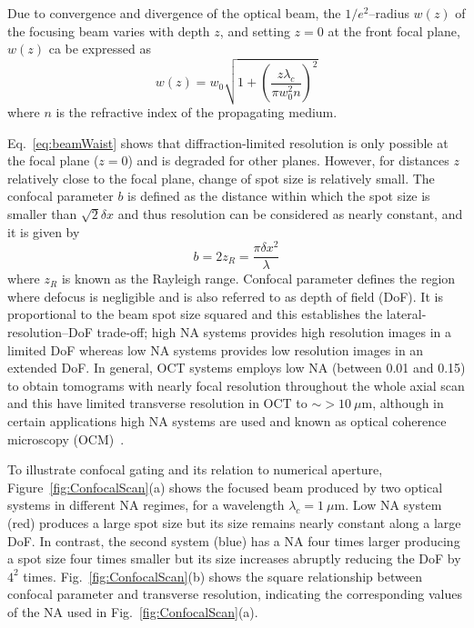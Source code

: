 Due to convergence and divergence of the optical beam, the $1/e^2$--radius $w(z)$  of the focusing beam varies with depth $z$, and setting $z=0$ at the front focal plane, $w(z)$ ca be expressed as~\cite{Ralston2005_Deconvolution}
\begin{equation}\label{eq:beamWaist}
    w(z) = w_0 \sqrt{1 + \left(\frac{z\lambda_c}{\pi w_0^2n}\right)^2}
\end{equation}
where $n$ is the refractive index of the propagating medium.

Eq.~\ref{eq:beamWaist} shows that diffraction-limited resolution is only possible at the focal plane ($z=0$) and is degraded for other planes. However, for distances $z$ relatively close to the focal plane, change of spot size is relatively small. The confocal parameter $b$ is defined as the distance within which the spot size is smaller than $\sqrt{2}\delta x$ and thus resolution can be considered as nearly constant, and it is given by~\cite{Ralston2005_Deconvolution}
\begin{equation}
    b = 2z_R = \frac{\pi\delta x^2}{\lambda}
\end{equation}
where $z_R$ is known as the Rayleigh range. Confocal parameter defines the region where defocus is negligible and is also referred to as depth of field (DoF). It is proportional to the beam spot size squared and this establishes the lateral-resolution--DoF trade-off; high NA systems provides high resolution images in a limited DoF whereas low NA systems provides low resolution images in an extended DoF. In general, OCT systems employs low NA (between 0.01 and 0.15) to obtain tomograms with nearly focal resolution throughout the whole axial scan and this have limited transverse resolution in OCT to $\sim>10~\mu$m, although in certain applications high NA systems are used and known as optical coherence microscopy (OCM)~\cite{Fujimoto2015_Introduction}.

To illustrate confocal gating and its relation to numerical aperture, Figure~\ref{fig:ConfocalScan}(a) shows the focused beam produced by two optical systems in different NA regimes, for a wavelength $\lambda_c = 1~\mu$m. Low NA system (red) produces a large spot size but its size remains nearly constant along a large DoF. In contrast, the second system (blue) has a NA four times larger producing a spot size four times smaller but its size increases abruptly reducing the DoF by $4^2$ times. Fig.~\ref{fig:ConfocalScan}(b) shows the square relationship between confocal parameter and transverse resolution, indicating the corresponding values of the NA used in Fig.~\ref{fig:ConfocalScan}(a).

